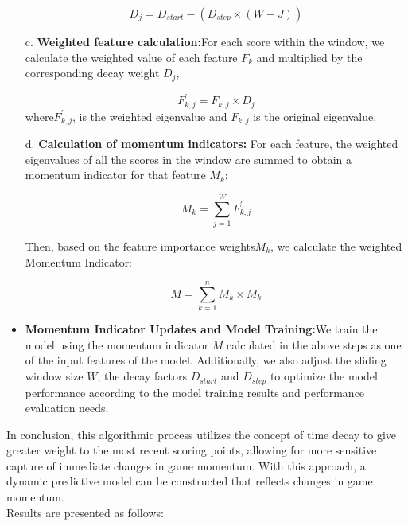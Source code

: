 \documentclass{mcmthesis}
\begin{document}
\begin{itemize}
    \begin{equation} \label{15}
        D_{j}=D_{start}-(D_{step}\times(W-J))
    \end{equation}

    \item[c.]{\bf Weighted feature calculation:}For each score within the window, we calculate the
    weighted value of each feature $F_{k}$ and multiplied by the corresponding decay weight $D_{j}$,

    \begin{equation} \label{16}
        F^{'} _{k,j} =F _{k,j} \times D_{j}
    \end{equation}
    where$F^{'} _{k,j}$, is the weighted eigenvalue and $F_{k,j}$ is the original eigenvalue.\\

    \item[d.]{\bf Calculation of momentum indicators:} For each feature, the weighted eigenvalues of all
    the scores in the window are summed to obtain a momentum indicator for that feature $M_{k}$:

    \begin{equation} \label{17}
        M_{k}= {\textstyle \sum_{j=1}^{W}F^{'} _{k,j}} 
    \end{equation}

    Then, based on the feature importance weights$ M_{k}$, we calculate the weighted Momentum
    Indicator:

    \begin{equation} \label{18}
        M= {\textstyle \sum_{k=1}^{n}M_{k}\times M_{k}} 
    \end{equation}

    \item {\bf Momentum Indicator Updates and Model Training:}We train the model using the
    momentum indicator $M$ calculated in the above steps as one of the input features of the model. Additionally, we also adjust the sliding window size $W$, the decay factors $D_{start}$ and $D_{step}$ to
    optimize the model performance according to the model training results and performance
    evaluation needs.\\
\end{itemize}
 In conclusion, this algorithmic process utilizes the concept of time decay to give greater
weight to the most recent scoring points, allowing for more sensitive capture of immediate
changes in game momentum. With this approach, a dynamic predictive model can be
constructed that reflects changes in game momentum. \\
Results are presented as follows:
\end{document}
